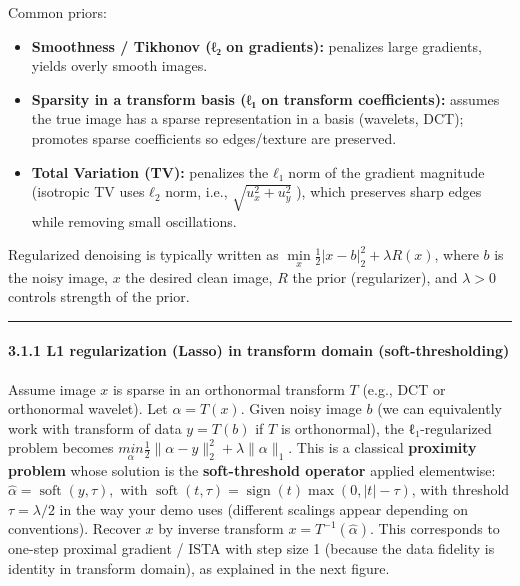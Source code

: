 \documentclass[11pt]{article}
\providecommand{\tightlist}{%
      \setlength{\itemsep}{0pt}\setlength{\parskip}{0pt}}
\begin{document}
Common priors:

\begin{itemize}
\tightlist
\item
  \textbf{Smoothness / Tikhonov (ℓ₂ on gradients):} penalizes large
  gradients, yields overly smooth images.
\item
  \textbf{Sparsity in a transform basis (ℓ₁ on transform coefficients):}
  assumes the true image has a sparse representation in a basis
  (wavelets, DCT); promotes sparse coefficients so edges/texture are
  preserved.
\item
  \textbf{Total Variation (TV):} penalizes the \(ℓ₁\) norm of the
  gradient magnitude (isotropic TV uses \(ℓ_2\) norm, i.e.,
  \(\sqrt{u_x^2+u_y^2}\;\)), which preserves sharp edges while removing
  small oscillations.
\end{itemize}

Regularized denoising is typically written as
\(\underset{x}{\min} \frac{1}{2}|x - b|_2^2 + \lambda R(x)\), where
\(b\) is the noisy image, \(x\) the desired clean image, \(R\) the prior
(regularizer), and \(\lambda>0\) controls strength of the prior.

\begin{center}\rule{0.5\linewidth}{0.5pt}\end{center}

\hypertarget{l1-regularization-lasso-in-transform-domain-soft-thresholding}{%
\paragraph{\texorpdfstring{\textbf{3.1.1 L1 regularization (Lasso) in
transform domain
(soft-thresholding)}}{3.1.1 L1 regularization (Lasso) in transform domain (soft-thresholding)}}\label{l1-regularization-lasso-in-transform-domain-soft-thresholding}}

Assume image \(x\) is sparse in an orthonormal transform \(T\) (e.g.,
DCT or orthonormal wavelet). Let \(\alpha = T(x)\). Given noisy image
\(b\) (we can equivalently work with transform of data \(y=T(b)\) if
\(T\) is orthonormal), the ℓ₁-regularized problem becomes
\(\underset{\alpha}{min} \tfrac12 \| \alpha - y \|_2^2 + \lambda \|\alpha\|_1\).
This is a classical \textbf{proximity problem} whose solution is the
\textbf{soft-threshold operator} applied elementwise:
\(\hat{\alpha} = \operatorname{soft}(y, \tau), \text{ with } \operatorname{soft}(t,\tau)=\operatorname{sign}(t)\max(0,|t|-\tau)\),
with threshold \(\tau=\lambda/2\) in the way your demo uses (different
scalings appear depending on conventions). Recover \(x\) by inverse
transform \(x = T^{-1}(\hat\alpha)\). This corresponds to one-step
proximal gradient / ISTA with step size 1 (because the data fidelity is
identity in transform domain), as explained in the next figure.
\end{document}
